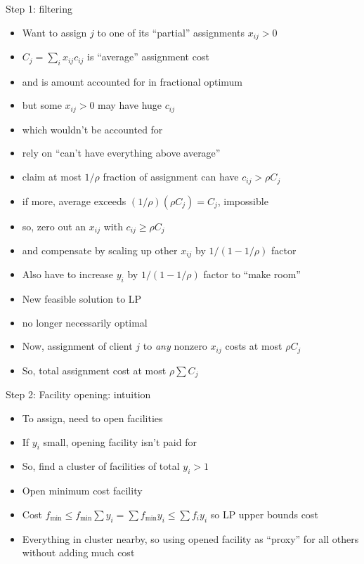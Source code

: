 \documentclass{article}
\begin{document}
Step 1: filtering
\begin{itemize}
\item Want to assign $j$ to one of its ``partial'' assignments
  $x_{ij}>0$
\item $C_j = \sum_i x_{ij}c_{ij}$ is ``average'' assignment cost
\item and is amount accounted for in fractional optimum
\item but some $x_{ij}>0$ may have huge $c_{ij}$
\item which wouldn't be accounted for
\item rely on ``can't have everything above average''
\item claim at most $1/\rho$ fraction of assignment can have
  $c_{ij}>\rho C_j$
\item if more, average exceeds $(1/\rho)(\rho C_j)=C_j$, impossible
\item so, zero out an $x_{ij}$ with $c_{ij} \ge \rho C_j$
\item and compensate by scaling up other $x_{ij}$ by $1/(1-1/\rho)$ factor
\item Also have to increase $y_i$ by $1/(1-1/\rho)$ factor to ``make room''
\item New feasible solution to LP
\item no longer necessarily optimal
\item Now, assignment of client $j$ to \emph{any} nonzero $x_{ij}$
  costs at most $\rho C_j$
\item So, total assignment cost at most $\rho\sum C_j$
\end{itemize}

Step 2: Facility opening: intuition
\begin{itemize}
\item To assign, need to open facilities
\item If $y_i$ small, opening facility isn't paid for
\item So, find a cluster of facilities of total $y_i > 1$
\item Open minimum cost facility
\item Cost $f_{\min}\le f_{\min}\sum y_i = \sum f_{\min}y_i \le \sum f_i y_i$ so LP upper bounds cost
\item Everything in cluster nearby, so using opened facility as
  ``proxy'' for all others without adding much cost
\end{itemize}
\end{document}

